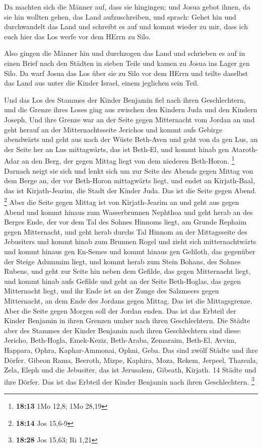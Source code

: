  Da machten sich die Männer auf, dass sie hingingen; und
Josua gebot ihnen, da sie hin wollten gehen, das Land aufzuschreiben,
und sprach: Gehet hin und durchwandelt das Land und schreibt es auf und
kommt wieder zu mir, dass ich euch hier das Los werfe vor dem HErrn zu
Silo.

 Also gingen die Männer hin und durchzogen das Land und
schrieben es auf in einen Brief nach den Städten in sieben Teile und
kamen zu Josua ins Lager gen Silo.  Da warf Josua das Los
über sie zu Silo vor dem HErrn und teilte daselbst das Land aus unter
die Kinder Israel, einem jeglichen sein Teil.

 Und das Los des Stammes der Kinder Benjamin fiel nach
ihren Geschlechtern, und die Grenze ihres Loses ging aus zwischen den
Kindern Juda und den Kindern Joseph.  Und ihre Grenze war
an der Seite gegen Mitternacht vom Jordan an und geht herauf an der
Mitternachtsseite Jerichos und kommt aufs Gebirge abendwärts und geht
aus nach der Wüste Beth-Aven  und geht von da gen Lus, an
der Seite her an Lus mittagwärts, das ist Beth-El, und kommt hinab gen
Ataroth-Adar an den Berg, der gegen Mittag liegt von dem niederen
Beth-Horon. \footnote{\textbf{18:13} 1Mo 12,8; 1Mo 28,19} 
Darnach neigt sie sich und lenkt sich um zur Seite des Abends gegen
Mittag von dem Berge an, der vor Beth-Horon mittagwärts liegt, und endet
an Kirjath-Baal, das ist Kirjath-Jearim, die Stadt der Kinder Juda. Das
ist die Seite gegen Abend. \footnote{\textbf{18:14} Jos 15,6-9}
 Aber die Seite gegen Mittag ist von Kirjath-Jearim an und
geht aus gegen Abend und kommt hinaus zum Wasserbrunnen Nephthoa
 und geht herab an des Berges Ende, der vor dem Tal des
Sohnes Hinnoms liegt, am Grunde Rephaim gegen Mitternacht, und geht
herab durchs Tal Hinnom an der Mittagsseite des Jebusiters und kommt
hinab zum Brunnen Rogel  und zieht sich mitternachtwärts
und kommt hinaus gen En-Semes und kommt hinaus gen Geliloth, das
gegenüber der Steige Adummim liegt, und kommt herab zum Stein Bohans,
des Sohnes Rubens,  und geht zur Seite hin neben dem
Gefilde, das gegen Mitternacht liegt, und kommt hinab aufs Gefilde
 und geht an der Seite Beth-Hoglas, das gegen Mitternacht
liegt, und ihr Ende ist an der Zunge des Salzmeers gegen Mitternacht, an
dem Ende des Jordans gegen Mittag. Das ist die Mittagsgrenze.
 Aber die Seite gegen Morgen soll der Jordan enden. Das ist
das Erbteil der Kinder Benjamin in ihren Grenzen umher nach ihren
Geschlechtern.  Die Städte aber des Stammes der Kinder
Benjamin nach ihren Geschlechtern sind diese: Jericho, Beth-Hogla,
Emek-Keziz,  Beth-Araba, Zemaraim, Beth-El, 
Avvim, Happara, Ophra,  Kaphar-Ammonai, Ophni, Geba. Das
sind zwölf Städte und ihre Dörfer.  Gibeon Rama, Beeroth,
 Mizpe, Kaphira, Moza,  Rekem, Jerpeel,
Thareala,  Zela, Eleph und die Jebusiter, das ist
Jerusalem, Gibeath, Kirjath. 14 Städte und ihre Dörfer. Das ist das
Erbteil der Kinder Benjamin nach ihren Geschlechtern. \footnote{\textbf{18:28}
  Jos 15,63; Ri 1,21}

